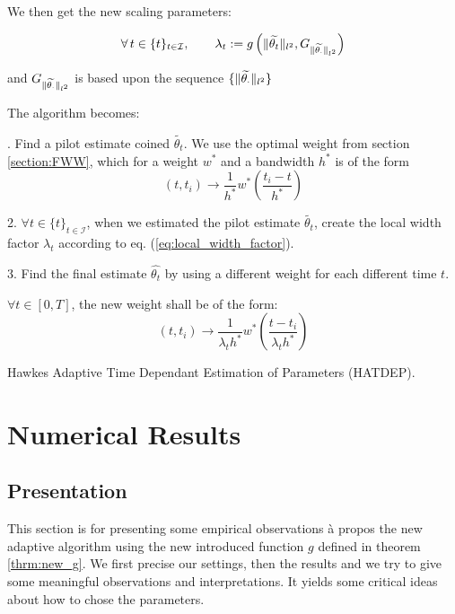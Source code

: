 \documentclass[11pt]{book}
\newcommand{\sequencetime}{\{t\}_{t \in \mathcal I} }
\begin{document}
We then get the new scaling parameters:


\begin{equation}
\forall t \in \sequencetime, \qquad \lambda_{t} :=  
g \left (\norm{\widetilde{\theta_{t}}}_{l^2}, 
G_{\norm{\widetilde{\theta_{\cdot}}}_{l^2}} \right)   
\end{equation}

and  $ G_{\lVert \widetilde{\theta_{\cdot}}\rVert_{l^2}} $ is based upon the sequence $\{ \lVert \widetilde{\theta_{\cdot}}\rVert_{l^2} \} $


The algorithm becomes:


\begin{algorithm}[H]
\label{algo:adaptive2}
. \quad Find a pilot estimate coined $\widetilde{\theta_t}$. We use the optimal weight from section \ref{section:FWW}, which for a weight $w^*$ and a bandwidth $h^*$ is of the form  $$ (t, t_i) \to \frac 1 {h^*} w^* \left ( \frac{t_i - t }{h^*} \right ) $$ 

2. \quad $\forall t \in \sequencetime$, when we estimated the pilot estimate $\widetilde{\theta_t}$, create the local width factor $\lambda_t$ according to eq. (\ref{eq:local_width_factor}). 

3. \quad Find the final estimate $\hat{\theta_t}$ by using a different weight for each different time $t$. 

$\forall t \in [0,T]$, the new weight shall be of the form:
$$ (t, t_i) \to \frac 1 {\lambda_{t} h^*} w^* \left ( \frac{t - t_i}{\lambda_{t} h^*} \right )$$ 
\caption{Hawkes Adaptive Time Dependant Estimation of Parameters (HATDEP).}
\end{algorithm}








\chapter{Numerical Results}

\section{Presentation}
This section is for presenting some empirical observations à propos the new adaptive algorithm using the new introduced function $g$ defined in theorem \ref{thrm:new_g}. We first precise our settings, then the results and we try to give some meaningful observations and interpretations. It yields some critical ideas about how to chose the parameters.
\end{document}
